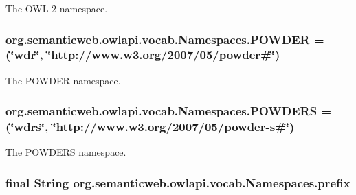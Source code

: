 The O\-W\-L 2 namespace. \hypertarget{enumorg_1_1semanticweb_1_1owlapi_1_1vocab_1_1_namespaces_a37ccaab81636975dc93bfc1100749498}{
\subsubsection[{P\-O\-W\-D\-E\-R}]{\setlength{\rightskip}{0pt plus 5cm}org.\-semanticweb.\-owlapi.\-vocab.\-Namespaces.\-P\-O\-W\-D\-E\-R =(\char`\"{}wdr\char`\"{}, \char`\"{}http\-://www.\-w3.\-org/2007/05/powder\#\char`\"{})}}\label{enumorg_1_1semanticweb_1_1owlapi_1_1vocab_1_1_namespaces_a37ccaab81636975dc93bfc1100749498}
The P\-O\-W\-D\-E\-R namespace. \hypertarget{enumorg_1_1semanticweb_1_1owlapi_1_1vocab_1_1_namespaces_a1d06ba5e08fa2fcc84457301615e3232}{
\subsubsection[{P\-O\-W\-D\-E\-R\-S}]{\setlength{\rightskip}{0pt plus 5cm}org.\-semanticweb.\-owlapi.\-vocab.\-Namespaces.\-P\-O\-W\-D\-E\-R\-S =(\char`\"{}wdrs\char`\"{}, \char`\"{}http\-://www.\-w3.\-org/2007/05/powder-\/s\#\char`\"{})}}\label{enumorg_1_1semanticweb_1_1owlapi_1_1vocab_1_1_namespaces_a1d06ba5e08fa2fcc84457301615e3232}
The P\-O\-W\-D\-E\-R\-S namespace. \hypertarget{enumorg_1_1semanticweb_1_1owlapi_1_1vocab_1_1_namespaces_ab0b84686444b1712130cd555c9bfbbf4}{
\subsubsection[{prefix}]{\setlength{\rightskip}{0pt plus 5cm}final String org.\-semanticweb.\-owlapi.\-vocab.\-Namespaces.\-prefix}}\label{enumorg_1_1semanticweb_1_1owlapi_1_1vocab_1_1_namespaces_ab0b84686444b1712130cd555c9bfbbf4}

